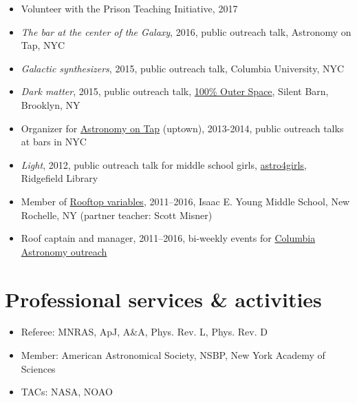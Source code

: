 \documentclass[12pt, letterpaper]{apw-cv}
\begin{document}
\begin{itemize}
    \item Volunteer with the Prison Teaching Initiative, 2017
    \item \emph{The bar at the center of the Galaxy}, 2016, public outreach talk, Astronomy on Tap, NYC
    \item \emph{Galactic synthesizers}, 2015, public outreach talk, Columbia University, NYC
    \item \emph{Dark matter}, 2015, public outreach talk, \href{http://silentbarn.org/2015/03/100-outer-space-party}{100\% Outer Space}, Silent Barn, Brooklyn, NY
    \item Organizer for \href{http://astronomyontap.org/}{Astronomy on Tap} (uptown), 2013-2014, public outreach talks at bars in NYC
    \item \emph{Light}, 2012, public outreach talk for middle school girls, \href{http://www.newstimes.com/news/article/Astronomer-Shoot-for-the-stars-3380793.php}{astro4girls}, Ridgefield Library
    \item Member of \href{http://rv.astro.columbia.edu}{Rooftop variables}, 2011--2016, Isaac E. Young Middle School, New Rochelle, NY (partner teacher: Scott Misner)
    \item Roof captain and manager, 2011--2016, bi-weekly events for \href{http://outreach.astro.columbia.edu/}{Columbia Astronomy outreach}
\end{itemize}

\section*{Professional services \& activities}

\begin{itemize}
	\item Referee: MNRAS, ApJ, A\&A, Phys. Rev. L, Phys. Rev. D
	\item Member: American Astronomical Society, NSBP, New York Academy of Sciences
    \item TACs: NASA, NOAO
\end{itemize}
\end{document}
